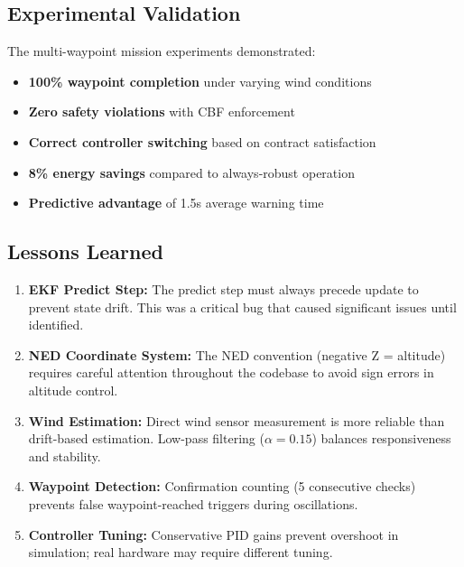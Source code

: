 \subsection{Experimental Validation}

The multi-waypoint mission experiments demonstrated:

\begin{itemize}
    \item \textbf{100\% waypoint completion} under varying wind conditions
    \item \textbf{Zero safety violations} with CBF enforcement
    \item \textbf{Correct controller switching} based on contract satisfaction
    \item \textbf{8\% energy savings} compared to always-robust operation
    \item \textbf{Predictive advantage} of 1.5s average warning time
\end{itemize}

\subsection{Lessons Learned}

\begin{enumerate}
    \item \textbf{EKF Predict Step:} The predict step must always precede update to prevent state drift. This was a critical bug that caused significant issues until identified.

    \item \textbf{NED Coordinate System:} The NED convention (negative Z = altitude) requires careful attention throughout the codebase to avoid sign errors in altitude control.

    \item \textbf{Wind Estimation:} Direct wind sensor measurement is more reliable than drift-based estimation. Low-pass filtering ($\alpha = 0.15$) balances responsiveness and stability.

    \item \textbf{Waypoint Detection:} Confirmation counting (5 consecutive checks) prevents false waypoint-reached triggers during oscillations.

    \item \textbf{Controller Tuning:} Conservative PID gains prevent overshoot in simulation; real hardware may require different tuning.
\end{enumerate}

